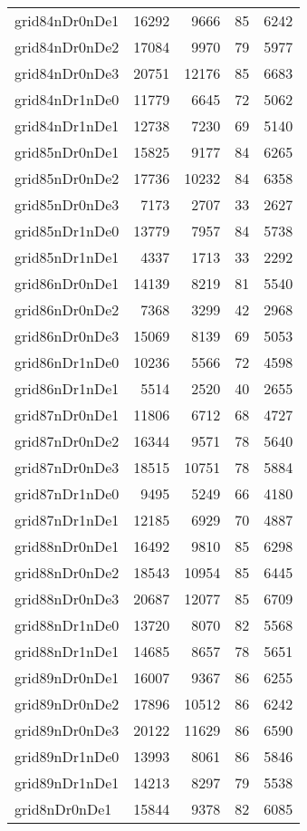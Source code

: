 \begin{longtable}{lrrrr}
grid84nDr0nDe1 & 16292 & 9666 & 85 & 6242 \\
grid84nDr0nDe2 & 17084 & 9970 & 79 & 5977 \\
grid84nDr0nDe3 & 20751 & 12176 & 85 & 6683 \\
grid84nDr1nDe0 & 11779 & 6645 & 72 & 5062 \\
grid84nDr1nDe1 & 12738 & 7230 & 69 & 5140 \\
grid85nDr0nDe1 & 15825 & 9177 & 84 & 6265 \\
grid85nDr0nDe2 & 17736 & 10232 & 84 & 6358 \\
grid85nDr0nDe3 & 7173 & 2707 & 33 & 2627 \\
grid85nDr1nDe0 & 13779 & 7957 & 84 & 5738 \\
grid85nDr1nDe1 & 4337 & 1713 & 33 & 2292 \\
grid86nDr0nDe1 & 14139 & 8219 & 81 & 5540 \\
grid86nDr0nDe2 & 7368 & 3299 & 42 & 2968 \\
grid86nDr0nDe3 & 15069 & 8139 & 69 & 5053 \\
grid86nDr1nDe0 & 10236 & 5566 & 72 & 4598 \\
grid86nDr1nDe1 & 5514 & 2520 & 40 & 2655 \\
grid87nDr0nDe1 & 11806 & 6712 & 68 & 4727 \\
grid87nDr0nDe2 & 16344 & 9571 & 78 & 5640 \\
grid87nDr0nDe3 & 18515 & 10751 & 78 & 5884 \\
grid87nDr1nDe0 & 9495 & 5249 & 66 & 4180 \\
grid87nDr1nDe1 & 12185 & 6929 & 70 & 4887 \\
grid88nDr0nDe1 & 16492 & 9810 & 85 & 6298 \\
grid88nDr0nDe2 & 18543 & 10954 & 85 & 6445 \\
grid88nDr0nDe3 & 20687 & 12077 & 85 & 6709 \\
grid88nDr1nDe0 & 13720 & 8070 & 82 & 5568 \\
grid88nDr1nDe1 & 14685 & 8657 & 78 & 5651 \\
grid89nDr0nDe1 & 16007 & 9367 & 86 & 6255 \\
grid89nDr0nDe2 & 17896 & 10512 & 86 & 6242 \\
grid89nDr0nDe3 & 20122 & 11629 & 86 & 6590 \\
grid89nDr1nDe0 & 13993 & 8061 & 86 & 5846 \\
grid89nDr1nDe1 & 14213 & 8297 & 79 & 5538 \\
grid8nDr0nDe1 & 15844 & 9378 & 82 & 6085 \\

\end{longtable}
